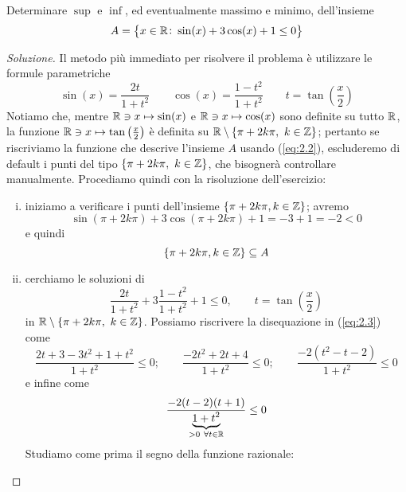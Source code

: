\begin{exercise}
    \label{ex:2.4}
    Determinare $\sup$ e $\inf$, ed eventualmente massimo e minimo, dell'insieme
    \[
    A = \left\{ x\in\amsbb{R} \colon \sin(x)+3\cos(x)+1 \le 0 \right\}
    \]
\end{exercise}
\begin{proof}[Soluzione]
    Il metodo più immediato per risolvere il problema è utilizzare le formule parametriche
    \begin{equation}
            \label{eq:2.2}
            \sin(x) = \frac{2t}{1+t^2} \qquad \cos(x) = \frac{1-t^2}{1+t^2} \qquad t = \tan\left(\frac{x}{2}\right)
    \end{equation}
    Notiamo che, mentre $\amsbb{R}\ni x \mapsto \sin(x)$ e $\amsbb{R}\ni x \mapsto \cos(x)$ sono definite su tutto $\amsbb{R}$, la funzione $\amsbb{R}\ni x \mapsto \tan\left(\frac{x}{2}\right)$ è definita su $\amsbb{R} \setminus \left\{\pi +2k\pi, \ k\in\amsbb{Z}\right\}$; pertanto se riscriviamo la funzione che descrive l'insieme $A$ usando (\ref{eq:2.2}), escluderemo di default i punti del tipo $\{\pi + 2k\pi, \ k\in\amsbb{Z}\}$, che bisognerà controllare manualmente. Procediamo quindi con la risoluzione dell'esercizio:
    \begin{enumerate}[(i)]
        \item iniziamo a verificare i punti dell'insieme $\{\pi + 2k\pi, k\in\amsbb{Z}\}$; avremo
        \[
        \sin(\pi + 2k\pi) + 3\cos(\pi+2k\pi)+1 = -3+1 = -2 <0
        \]
        e quindi
        \[
        \left\{\pi + 2k\pi, k\in\amsbb{Z}\right\}\subseteq A
        \]
        \item cerchiamo le soluzioni
        di
        \begin{equation}
            \label{eq:2.3}
            \frac{2t}{1+t^2}+3\frac{1-t^2}{1+t^2}+1\le 0, \qquad t= \tan\left(\frac{x}{2}\right)
        \end{equation}
        in $\amsbb{R}\setminus \{\pi+2k\pi, \ k\in\amsbb{Z}\}$. Possiamo riscrivere la disequazione in (\ref{eq:2.3}) come
        \[
        \frac{2t+3-3t^2+1+t^2}{1+t^2}\le 0; \qquad \frac{-2t^2+2t+4}{1+t^2}\le 0; \qquad \frac{-2(t^2-t-2)}{1+t^2}\le 0
        \]
        e infine come
        \[
        \frac{-2(t-2)(t+1)}{\underbrace{1+t^2}_{>0 \ \forall t\in\amsbb{R}}}\le 0
        \]
        Studiamo come prima il segno della funzione razionale:
        \begin{center}
\end{center}
\end{enumerate}
\end{proof}
